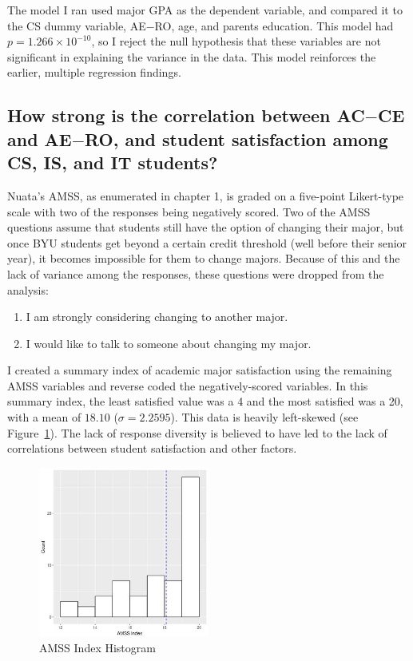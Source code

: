 The model I ran used major GPA as the dependent variable, and compared it to the CS dummy variable, AE$-$RO, age, and parents education. This model had $p=1.266\times 10^{-10}$, so I reject the null hypothesis that these variables are not significant in explaining the variance in the data. This model reinforces the earlier, multiple regression findings.

\subsection{How strong is the correlation between AC$-$CE and AE$-$RO, and student satisfaction among CS, IS, and IT students?}
Nuata's AMSS, as enumerated in chapter 1, is graded on a five-point Likert-type scale with two of the responses being negatively scored. Two of the AMSS questions assume that students still have the option of changing their major, but once BYU students get beyond a certain credit threshold (well before their senior year), it becomes impossible for them to change majors. Because of this and the lack of variance among the responses, these questions were dropped from the analysis:
\begin{enumerate}
  \item I am strongly considering changing to another major.
  \item I would like to talk to someone about changing my major.
\end{enumerate}

I created a summary index of academic major satisfaction using the remaining AMSS variables and reverse coded the negatively-scored variables. In this summary index, the least satisfied value was a 4 and the most satisfied was a 20, with a mean of $18.10$ ($\sigma=2.2595$). This data is heavily left-skewed (see Figure~\ref{fig:amss_index_plot}). The lack of response diversity is believed to have led to the lack of correlations between student satisfaction and other factors.

\begin{figure}[!hbtp]
  \centering
  \includegraphics[width=0.5\textwidth]{figures/chapter4/amss_index_plot.jpg}
  \caption{AMSS Index Histogram}
  \label{fig:amss_index_plot}
\end{figure}

